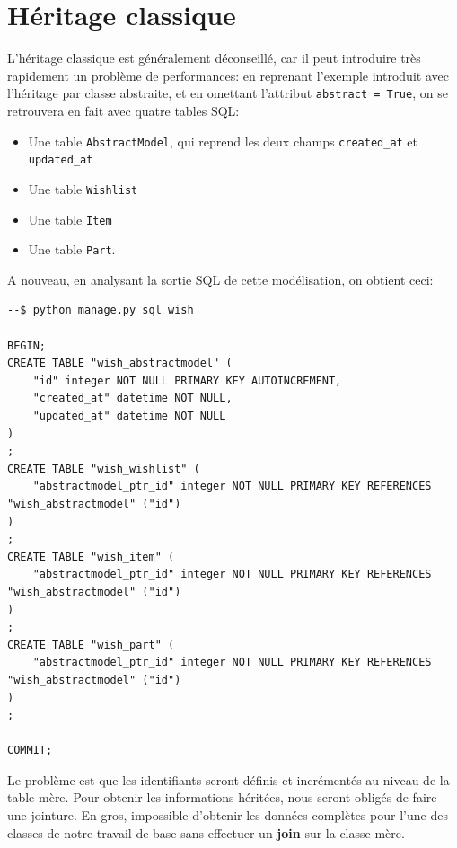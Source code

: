 \documentclass[11pt]{amsbook}
\begin{document}
\hypertarget{x-héritage-classique}{\section{Héritage classique}}
L’héritage classique est généralement déconseillé, car il peut introduire très rapidement un problème de performances: en reprenant l’exemple introduit avec l’héritage par classe abstraite, et en omettant l’attribut \texttt{abstract = True}, on se retrouvera en fait avec quatre tables SQL:


\begin{itemize}

\item Une table \texttt{AbstractModel}, qui reprend les deux champs \texttt{created\_at} et \texttt{updated\_at}

\item Une table \texttt{Wishlist}

\item Une table \texttt{Item}

\item Une table \texttt{Part}.

\end{itemize}


A nouveau, en analysant la sortie SQL de cette modélisation, on obtient ceci:


\begin{verbatim}
--$ python manage.py sql wish

BEGIN;
CREATE TABLE "wish_abstractmodel" (
    "id" integer NOT NULL PRIMARY KEY AUTOINCREMENT,
    "created_at" datetime NOT NULL,
    "updated_at" datetime NOT NULL
)
;
CREATE TABLE "wish_wishlist" (
    "abstractmodel_ptr_id" integer NOT NULL PRIMARY KEY REFERENCES "wish_abstractmodel" ("id")
)
;
CREATE TABLE "wish_item" (
    "abstractmodel_ptr_id" integer NOT NULL PRIMARY KEY REFERENCES "wish_abstractmodel" ("id")
)
;
CREATE TABLE "wish_part" (
    "abstractmodel_ptr_id" integer NOT NULL PRIMARY KEY REFERENCES "wish_abstractmodel" ("id")
)
;

COMMIT;
\end{verbatim}

Le problème est que les identifiants seront définis et incrémentés au niveau de la table mère. Pour obtenir les informations héritées, nous seront obligés de faire une jointure. En gros, impossible d’obtenir les données complètes pour l’une des classes de notre travail de base sans effectuer un \textbf{join} sur la classe mère.
\end{document}
